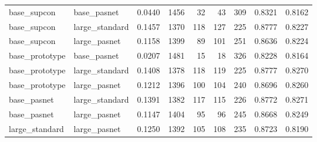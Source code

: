 \begin{tabular}{llrrrrrrr}
base\_supcon & base\_pasnet & 0.0440 & 1456 & 32 & 43 & 309 & 0.8321 & 0.8162 \\
base\_supcon & large\_standard & 0.1457 & 1370 & 118 & 127 & 225 & 0.8777 & 0.8227 \\
base\_supcon & large\_pasnet & 0.1158 & 1399 & 89 & 101 & 251 & 0.8636 & 0.8224 \\
base\_prototype & base\_pasnet & 0.0207 & 1481 & 15 & 18 & 326 & 0.8228 & 0.8164 \\
base\_prototype & large\_standard & 0.1408 & 1378 & 118 & 119 & 225 & 0.8777 & 0.8270 \\
base\_prototype & large\_pasnet & 0.1212 & 1396 & 100 & 104 & 240 & 0.8696 & 0.8260 \\
base\_pasnet & large\_standard & 0.1391 & 1382 & 117 & 115 & 226 & 0.8772 & 0.8271 \\
base\_pasnet & large\_pasnet & 0.1147 & 1404 & 95 & 96 & 245 & 0.8668 & 0.8249 \\
large\_standard & large\_pasnet & 0.1250 & 1392 & 105 & 108 & 235 & 0.8723 & 0.8190 \\
\bottomrule
\end{tabular}
